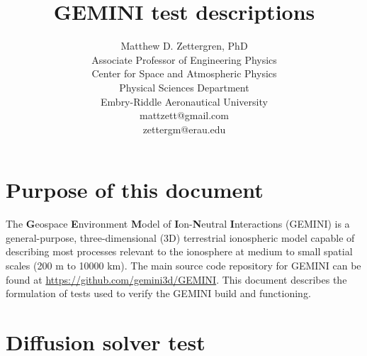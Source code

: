 \documentclass[11pt,letterpaper]{article}
\begin{document}
\setlength{\parindent}{0mm}
\setlength{\parskip}{0.4cm}




\title{\textbf{GEMINI} test descriptions}
\author{Matthew D. Zettergren, PhD\\ Associate Professor of Engineering Physics\\ Center for Space and Atmospheric Physics\\ Physical Sciences Department \\Embry-Riddle Aeronautical University\\mattzett@gmail.com\\zettergm@erau.edu}
\maketitle

\tableofcontents

\pagebreak


\section{Purpose of this document}

The \textbf{G}eospace \textbf{E}nvironment \textbf{M}odel of \textbf{I}on-\textbf{N}eutral \textbf{I}nteractions (GEMINI) is a general-purpose, three-dimensional (3D) terrestrial ionospheric model capable of describing most processes relevant to the ionosphere at medium to small spatial scales (200 m to 10000 km).  The main source code repository for GEMINI can be found at \url{https://github.com/gemini3d/GEMINI}.  This document describes the formulation of tests used to verify the GEMINI build and functioning.  


\section{Diffusion solver test}
\end{document}
